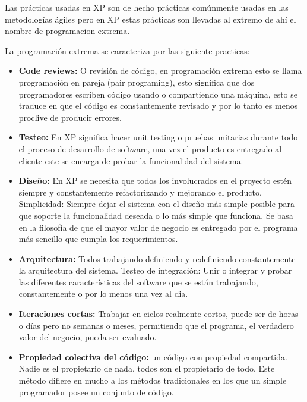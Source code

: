      Las prácticas usadas en XP son de hecho prácticas comúnmente usadas en las metodologías ágiles pero en XP estas prácticas son llevadas al extremo de ahí el nombre de programacion extrema.

     La programación extrema se caracteriza por las siguiente practicas: \cite{xpesp}

     \begin{itemize}
       \item \textbf{Code reviews:} O revisión de código, en programación extrema esto se llama programación en pareja (pair programing), esto significa que dos programadores escriben código usando o compartiendo una máquina, esto se traduce en que el código es constantemente revisado y por lo tanto es menos proclive de producir errores.

       \item \textbf{Testeo:} En XP significa hacer unit testing o pruebas unitarias durante todo el proceso de desarrollo de software, una vez el producto es entregado al cliente este se encarga de probar la funcionalidad del sistema.

       \item \textbf{Diseño:} En XP se necesita que todos los involucrados en el proyecto estén siempre y constantemente refactorizando y mejorando el producto.
       Simplicidad: Siempre dejar el sistema con el diseño más simple posible para que soporte la funcionalidad deseada o lo más simple que funciona. Se basa en la filosofía de que el mayor valor de negocio es entregado por el programa más sencillo que cumpla los requerimientos.

       \item \textbf{Arquitectura:} Todos trabajando definiendo y redefiniendo constantemente la arquitectura del sistema.
       Testeo de integración: Unir o integrar y probar las diferentes características del software que se están trabajando, constantemente o por lo menos una vez al dia.

       \item \textbf{Iteraciones cortas:}
       Trabajar en ciclos realmente cortos, puede ser de horas o días pero no semanas o meses, permitiendo que el programa, el verdadero valor del negocio, pueda ser evaluado.

       \item \textbf{Propiedad colectiva del código:}
       un código con propiedad compartida. Nadie es el propietario de nada, todos son el propietario de todo. Este método difiere en mucho a los métodos tradicionales en los que un simple programador posee un conjunto de código.


\end{itemize}
